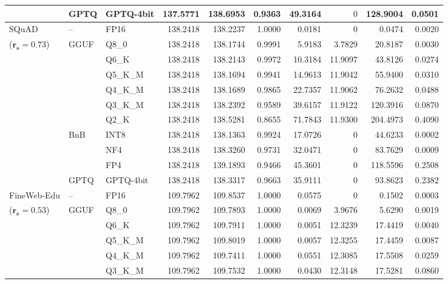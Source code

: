 \begin{longtable}{ll l rrrrrrr}
 & GPTQ & GPTQ-4bit & 137.5771 & 138.6953 & \cellcolor{red!18} 0.9363 & \cellcolor{red!18} 49.3164 & \cellcolor{cyan!12} $0$ & \cellcolor{red!18} 128.9004 & \cellcolor{red!18} 0.0501 \\
\midrule
SQuAD & -- & FP16 & 138.2418 & 138.2237 & 1.0000 & 0.0181 & \cellcolor{cyan!12} $0$ & 0.0474 & 0.0020 \\
{\small ($\mathbf{r_s{=}0.73}$)} & GGUF & Q8\_0 & 138.2418 & 138.1744 & 0.9991 & 5.9183 & 3.7829 & 20.8187 & 0.0030 \\
 &  & Q6\_K & 138.2418 & 138.2143 & 0.9972 & 10.3184 & 11.9097 & 43.8126 & 0.0274 \\
 &  & Q5\_K\_M & 138.2418 & 138.1694 & 0.9941 & 14.9613 & 11.9042 & 55.9400 & 0.0310 \\
 &  & Q4\_K\_M & 138.2418 & 138.1689 & 0.9865 & 22.7357 & 11.9062 & 76.2632 & 0.0488 \\
 &  & Q3\_K\_M & 138.2418 & 138.2392 & 0.9589 & 39.6157 & 11.9122 & 120.3916 & 0.0870 \\
 &  & Q2\_K & 138.2418 & 138.5281 & \cellcolor{red!18} 0.8655 & \cellcolor{red!18} 71.7843 & 11.9300 & \cellcolor{red!18} 204.4973 & \cellcolor{red!18} 0.4090 \\
 & BnB & INT8 & 138.2418 & 138.1363 & 0.9924 & 17.0726 & \cellcolor{cyan!12} $0$ & 44.6233 & 0.0002 \\
 &  & NF4 & 138.2418 & 138.3260 & 0.9731 & 32.0471 & \cellcolor{cyan!12} $0$ & 83.7629 & 0.0009 \\
 &  & FP4 & 138.2418 & 139.1893 & \cellcolor{red!18} 0.9466 & \cellcolor{red!18} 45.3601 & \cellcolor{cyan!12} $0$ & \cellcolor{red!18} 118.5596 & \cellcolor{red!18} 0.2508 \\
 & GPTQ & GPTQ-4bit & 138.2418 & 138.3317 & 0.9663 & 35.9111 & \cellcolor{cyan!12} $0$ & 93.8623 & 0.2382 \\
\midrule
FineWeb-Edu & -- & FP16 & 109.7962 & 109.8537 & 1.0000 & 0.0575 & \cellcolor{cyan!12} $0$ & 0.1502 & 0.0003 \\
{\small ($\mathbf{r_s{=}0.53}$)} & GGUF & Q8\_0 & 109.7962 & 109.7893 & 1.0000 & 0.0069 & 3.9676 & 5.6290 & 0.0019 \\
 &  & Q6\_K & 109.7962 & 109.7911 & 1.0000 & 0.0051 & 12.3239 & 17.4419 & 0.0040 \\
 &  & Q5\_K\_M & 109.7962 & 109.8019 & 1.0000 & 0.0057 & 12.3255 & 17.4459 & 0.0087 \\
 &  & Q4\_K\_M & 109.7962 & 109.7411 & 1.0000 & 0.0551 & 12.3085 & 17.5508 & 0.0259 \\
 &  & Q3\_K\_M & 109.7962 & 109.7532 & 1.0000 & 0.0430 & 12.3148 & 17.5281 & 0.0860 \\

\end{longtable}
